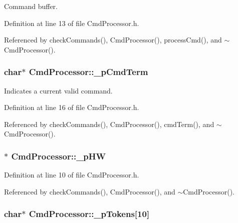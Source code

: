 Command buffer. 



Definition at line 13 of file CmdProcessor.h.



Referenced by checkCommands(), CmdProcessor(), processCmd(), and $\sim$CmdProcessor().

\hypertarget{class_cmd_processor_ac3499e23267a4f54dc409e51555d4b26}{
\subsubsection[{\_\-pCmdTerm}]{\setlength{\rightskip}{0pt plus 5cm}char$\ast$ {\bf CmdProcessor::\_\-pCmdTerm}}}
\label{class_cmd_processor_ac3499e23267a4f54dc409e51555d4b26}


Indicates a current valid command. 



Definition at line 16 of file CmdProcessor.h.



Referenced by checkCommands(), CmdProcessor(), cmdTerm(), and $\sim$CmdProcessor().

\hypertarget{class_cmd_processor_a8df6f12b27223c1f1876ea7221cd2413}{
\subsubsection[{\_\-pHW}]{$\ast$ {\bf CmdProcessor::\_\-pHW}}}
\label{class_cmd_processor_a8df6f12b27223c1f1876ea7221cd2413}


Definition at line 10 of file CmdProcessor.h.



Referenced by checkCommands(), CmdProcessor(), and $\sim$CmdProcessor().

\hypertarget{class_cmd_processor_a2b857367533cd33ba9a68746c71c5e3d}{
\subsubsection[{\_\-pTokens}]{\setlength{\rightskip}{0pt plus 5cm}char$\ast$ {\bf CmdProcessor::\_\-pTokens}\mbox{[}10\mbox{]}}}
\label{class_cmd_processor_a2b857367533cd33ba9a68746c71c5e3d}


